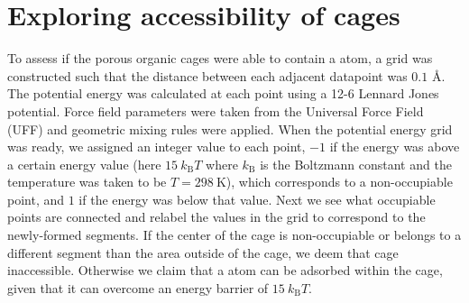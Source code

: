 \documentclass[journal=jacsat,manuscript=article]{achemso}
\begin{document}
\clearpage

\section{\color{red}Exploring accessibility of cages}
{\color{red}To assess if the porous organic cages were able to contain a  atom, a grid was constructed such that the distance between each adjacent datapoint was $0.1$ \AA. The potential energy was calculated at each point using a 12-6 Lennard Jones potential. Force field parameters were taken from the Universal Force Field (UFF) and geometric mixing rules were applied. When the potential energy grid was ready, we assigned an integer value to each point, $-1$ if the energy was above a certain energy value (here $15 \ k_\text{B}T$ where $k_\text{B}$ is the Boltzmann constant and the temperature was taken to be $T = 298 \ \text{K}$), which corresponds to a non-occupiable point, and $1$ if the energy was below that value. Next we see what occupiable points are connected and relabel the values in the grid to correspond to the newly-formed segments. If the center of the cage is non-occupiable or belongs to a different segment than the area outside of the cage, we deem that cage inaccessible. Otherwise we claim that a  atom can be adsorbed within the cage, given that it can overcome an energy barrier of $15 \ k_\text{B}T$.

}
\end{document}
